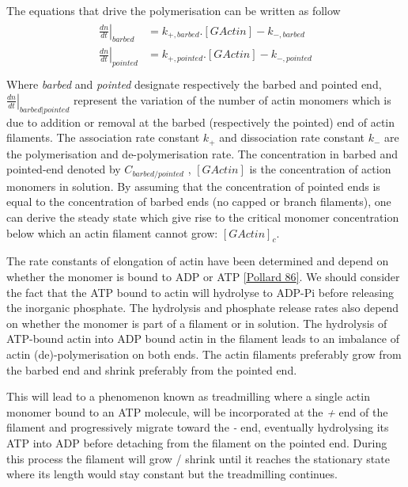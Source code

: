\documentclass[A4paperpaper,11pt,english]{sphinxmanual}
\begin{document}
The equations that drive the polymerisation can be written as follow
\label{index-latex:equation-roa1}\begin{gather}
\begin{split}\left. \frac{dn}{dt} \right|_{barbed} &= k_{+,{barbed}}.[GActin] - k_{-,{barbed}} \\
\left. \frac{dn}{dt} \right|_{pointed}&= k_{+,{pointed}}.[GActin]- k_{-,{pointed}} \\\end{split}\label{index-latex-roa1}
\end{gather}
Where \emph{barbed} and \emph{pointed} designate respectively the barbed and pointed end,
\(\left.\frac{dn}{dt} \right|_{barbed|pointed}\) represent the variation of
the number of actin monomers  which is due to addition or removal at the
barbed (respectively the pointed) end of actin filaments.  The association
rate constant \(k_+\) and dissociation rate constant \(k_-\) are the
polymerisation and de-polymerisation rate.  The concentration in barbed and
pointed-end denoted by \(C_{{barbed}/{pointed}}\) , \([GActin]\) is the
concentration of action monomers in solution. By assuming that the
concentration of pointed ends is equal to the concentration of barbed ends (no
capped or branch filaments), one can derive the steady state which give rise to
the critical monomer concentration below which an actin filament cannot grow:
\([GActin]_c\).

The rate constants of elongation of actin have been determined and depend on
whether the monomer is bound to ADP or ATP {\hyperref[index-latex:pollard1986]{{[}Pollard 86{]}}}. We should
consider the fact that the  ATP bound to actin will hydrolyse to ADP-Pi before releasing
the inorganic phosphate. The hydrolysis and phosphate release rates also depend on whether the
monomer is part of a filament or in solution. The hydrolysis of ATP-bound
actin into ADP bound actin in the filament  leads to an imbalance of actin
(de)-polymerisation on both ends. The actin filaments preferably
grow from the barbed end and shrink preferably from the pointed end.

This will lead to a phenomenon known as treadmilling where a single actin
monomer bound to an ATP molecule, will be incorporated at the \emph{+} end of the
filament and progressively migrate toward the \emph{-} end, eventually hydrolysing its
ATP into ADP before detaching from the filament on the pointed end. During this
process the filament will grow / shrink until it reaches the stationary state
where its length would stay constant but the treadmilling continues.
\end{document}
